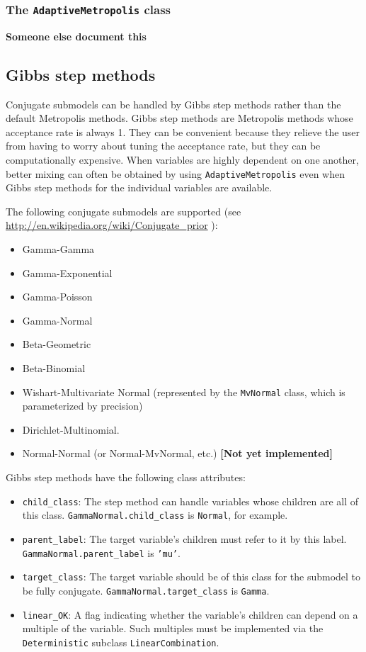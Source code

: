 \subsubsection{The \texttt{AdaptiveMetropolis} class} 
\textbf{Someone else document this}

\subsection{Gibbs step methods}
Conjugate submodels can be handled by Gibbs step methods rather than the default Metropolis methods. Gibbs step methods are Metropolis methods whose acceptance rate is always 1. They can be convenient because they relieve the user from having to worry about tuning the acceptance rate, but they can be computationally expensive. When variables are highly dependent on one another, better mixing can often be obtained by using \texttt{AdaptiveMetropolis} even when Gibbs step methods for the individual variables are available.

The following conjugate submodels are supported (see \href{http://en.wikipedia.org/wiki/Conjugate_prior}{http://en.wikipedia.org/wiki/Conjugate_prior} ):
\begin{itemize}
    \item Gamma-Gamma
    \item Gamma-Exponential
    \item Gamma-Poisson
    \item Gamma-Normal
    \item Beta-Geometric
    \item Beta-Binomial
    \item Wishart-Multivariate Normal (represented by the \texttt{MvNormal} class, which is parameterized by precision)
    \item Dirichlet-Multinomial.
    \item Normal-Normal (or Normal-MvNormal, etc.) \textbf{[Not yet implemented]}
\end{itemize}

Gibbs step methods have the following class attributes:
\begin{itemize}
    \item \texttt{child_class}: The step method can handle variables whose children are all of this class. \texttt{GammaNormal.child_class} is \texttt{Normal}, for example.
    \item \texttt{parent_label}: The target variable's children must refer to it by this label. \texttt{GammaNormal.parent_label} is \texttt{'mu'}.
    \item \texttt{target_class}: The target variable should be of this class for the submodel to be fully conjugate. \texttt{GammaNormal.target_class} is \texttt{Gamma}.
    \item \texttt{linear_OK}: A flag indicating whether the variable's children can depend on a multiple of the variable. Such multiples must be implemented via the \texttt{Deterministic} subclass \texttt{LinearCombination}.
\end{itemize}

